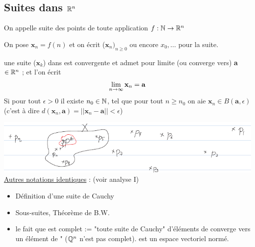 \documentclass[12pt,a4paper]{article}
\begin{document}
\subsection{Suites dans $\mathbb{R}^n$}
\begin{boite}
	 On appelle suite des points de \rn toute application $f:\mathbb{N}\to \mathbb{R}^n$
\end{boite}
 On pose $\textbf{x}_n = f(n)$ et on écrit ($\textbf{x}_n)_{n\geq 0}$ ou encore $x_0,\ldots$ pour la suite.\\
\begin{boite}
	une suite ($\textbf{x}_k$) dans \rn est convergente et admet pour limite (ou converge vers) \textbf{a}$\in \mathbb{R}^n$ ; et l'on écrit
	\begin{equation*}
		\lim\limits_{n \to \infty}{\textbf{x}_n} = \textbf{a}
	\end{equation*}
	Si pour tout $\epsilon>0$ il existe $n_0 \in \mathbb{N}$, tel que pour tout $n\geq n_0$ on aie $\textbf{x}_n \in B(\textbf{a},\epsilon)$ (c'est à dire $d(\textbf{x}_n,\textbf{a}) = ||\textbf{x}_n - \textbf{a}|| < \epsilon$)
\end{boite}
\includegraphics[scale=0.5]{images/converge}\\
\underline{Autres notations identiques} : (voir analyse I)
\begin{itemize}
	\item Définition d'une suite de Cauchy
	\item Sous-suites, Théorème de B.W.
	\item le fait que \rn est complet := "toute suite de Cauchy" d'éléments de \rn converge vers un élément de \rn" ($\mathbb{Q}^n$ n'est pas complet). \rn est un espace vectoriel normé.
	\end{itemize}
\end{document}
